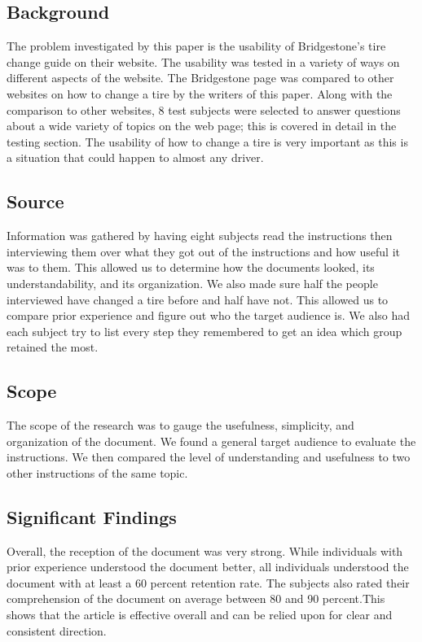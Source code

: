 \documentclass[12pt,A4paper]{article}
\begin{document}
		\subsection{Background}
		The problem investigated by this paper is the usability of Bridgestone’s tire change guide on their website. The usability was tested in a variety of ways on different aspects of the website. The Bridgestone page was compared to other websites on how to change a tire by the writers of this paper. Along with the comparison to other websites, 8 test subjects were selected to answer questions about a wide variety of topics on the web page; this is covered in detail in the testing section. The usability of how to change a tire is very important as this is a situation that could happen to almost any driver.  

		\subsection{Source}
		Information was gathered by having eight subjects read the instructions then interviewing them over what they got out of the instructions and how useful it was to them. This allowed us to determine how the documents looked, its understandability, and its organization. We also made sure half the people interviewed have changed a tire before and half have not. This allowed us to compare prior experience and figure out who the target audience is. We also had each subject try to list every step they remembered to get an idea which group retained the most. 

		\subsection{Scope}
		The scope of  the research was to gauge the usefulness, simplicity, and organization of the document. We found a general target audience to evaluate the instructions. We then compared the level of understanding and usefulness to two other instructions of the same topic.

		\subsection{Significant Findings}
		Overall, the reception of the document was very strong. While individuals with prior experience understood the document better, all individuals understood the document with at least a 60 percent retention rate. The subjects also rated their comprehension of the document on average between 80 and 90 percent.This shows that the article is effective overall and can be relied upon for clear and consistent direction. 
\end{document}
